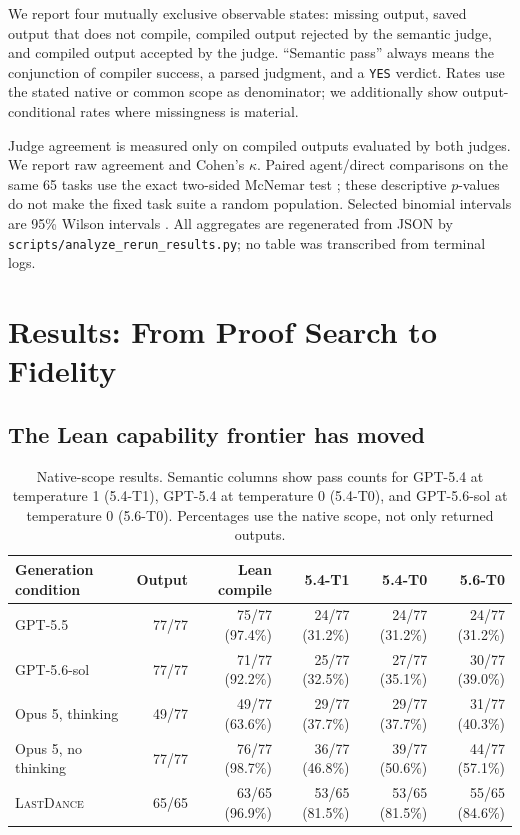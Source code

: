 \documentclass{article}
\newcommand{\lastdance}{\textsc{LastDance}}
\begin{document}
We report four mutually exclusive observable states: missing output, saved output that
does not compile, compiled output rejected by the semantic judge, and compiled output
accepted by the judge.  ``Semantic pass'' always means the conjunction of compiler
success, a parsed judgment, and a \texttt{YES} verdict.  Rates use the stated native or
common scope as denominator; we additionally show output-conditional rates where
missingness is material.

Judge agreement is measured only on compiled outputs evaluated by both judges.  We
report raw agreement and Cohen's $\kappa$\cite{cohen1960kappa}.  Paired agent/direct
comparisons on the same 65 tasks use the exact two-sided McNemar test
\cite{mcnemar1947}; these descriptive $p$-values do not make the fixed task suite a
random population.  Selected binomial intervals are 95\% Wilson intervals
\cite{wilson1927}.  All aggregates are regenerated from JSON by
\texttt{scripts/analyze\_rerun\_results.py}; no table was transcribed from terminal
logs.

\section{Results: From Proof Search to Fidelity}

\subsection{The Lean capability frontier has moved}

\begin{table}[t]
\centering
\small
\caption{Native-scope results.  Semantic columns show pass counts for GPT-5.4 at
temperature 1 (5.4-T1), GPT-5.4 at temperature 0 (5.4-T0), and GPT-5.6-sol at
temperature 0 (5.6-T0).  Percentages use the native scope, not only returned outputs.}
\label{tab:native-results}
\begin{tabular}{lrrrrr}
\toprule
Generation condition & Output & Lean compile & 5.4-T1 & 5.4-T0 & 5.6-T0 \\
\midrule
GPT-5.5 & 77/77 & 75/77 (97.4\%) & 24/77 (31.2\%) & 24/77 (31.2\%) & 24/77 (31.2\%) \\
GPT-5.6-sol & 77/77 & 71/77 (92.2\%) & 25/77 (32.5\%) & 27/77 (35.1\%) & 30/77 (39.0\%) \\
Opus 5, thinking & 49/77 & 49/77 (63.6\%) & 29/77 (37.7\%) & 29/77 (37.7\%) & 31/77 (40.3\%) \\
Opus 5, no thinking & 77/77 & 76/77 (98.7\%) & 36/77 (46.8\%) & 39/77 (50.6\%) & 44/77 (57.1\%) \\
\lastdance & 65/65 & 63/65 (96.9\%) & 53/65 (81.5\%) & 53/65 (81.5\%) & 55/65 (84.6\%) \\
\bottomrule
\end{tabular}
\end{table}
\end{document}
